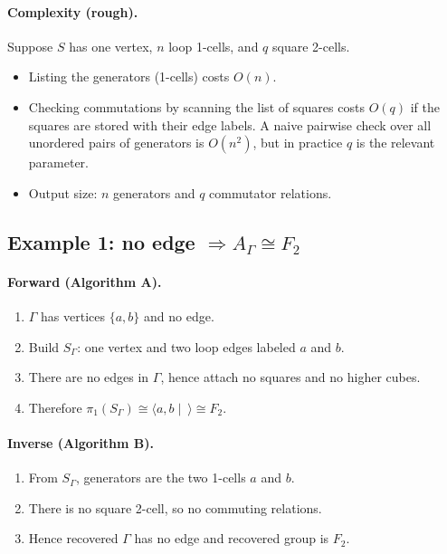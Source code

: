 \documentclass[11pt]{article}
\theoremstyle{definition}
\theoremstyle{plain}
\theoremstyle{remark}
\begin{document}
\paragraph{Complexity (rough).}\cite{salvetti1987,charney2007}
Suppose $S$ has one vertex, $n$ loop 1-cells, and $q$ square 2-cells.
\begin{itemize}[leftmargin=2em]
\item Listing the generators (1-cells) costs $O(n)$.
\item Checking commutations by scanning the list of squares costs $O(q)$ if the squares are stored with their edge labels.
A naive pairwise check over all unordered pairs of generators is $O(n^2)$, but in practice $q$ is the relevant parameter.
\item Output size: $n$ generators and $q$ commutator relations.
\end{itemize}
\subsection*{Example 1: no edge $\Rightarrow A_\Gamma\cong F_2$}
\paragraph{Forward (Algorithm A).}
\begin{enumerate}[leftmargin=2.2em]
\item $\Gamma$ has vertices $\{a,b\}$ and no edge.
\item Build $S_\Gamma$:
one vertex and two loop edges labeled $a$ and $b$.
\item There are no edges in $\Gamma$, hence attach no squares and no higher cubes.
\item Therefore $\pi_1(S_\Gamma)\cong \langle a,b\mid\ \rangle\cong F_2$.
\end{enumerate}

\paragraph{Inverse (Algorithm B).}
\begin{enumerate}[leftmargin=2.2em]
\item From $S_\Gamma$, generators are the two 1-cells $a$ and $b$.
\item There is no square 2-cell, so no commuting relations.
\item Hence recovered $\Gamma$ has no edge and recovered group is $F_2$.
\end{enumerate}
\end{document}
